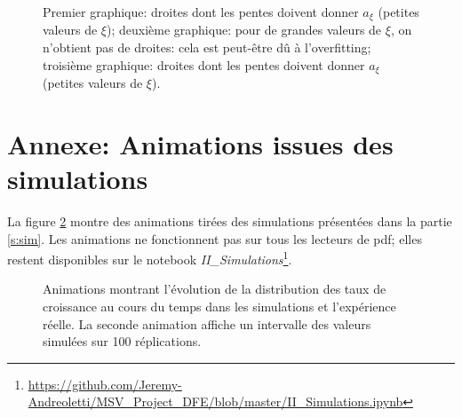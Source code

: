 \documentclass[12pt]{article}
\begin{document}
\begin{figure}[h]
\begin{center}
  \end{center}
  \caption{\label{fig:iv_verif}Premier graphique: droites dont les pentes doivent donner $a_{\xi}$ (petites valeurs de $\xi$); deuxième graphique: pour de grandes valeurs de $\xi$, on n'obtient pas de droites: cela est peut-être dû à l'overfitting; troisième graphique: droites dont les pentes doivent donner $a_{\xi}$ (petites valeurs de $\xi$).}
\end{figure}


\section{Annexe: Animations issues des simulations\label{ann:anim}}

La figure \ref{fig:animations} montre des animations tirées des simulations présentées dans la partie \ref{s:sim}. Les animations ne fonctionnent pas sur tous les lecteurs de pdf; elles restent disponibles sur le notebook \emph{II\_Simulations}\footnote{\url{https://github.com/Jeremy-Andreoletti/MSV_Project_DFE/blob/master/II_Simulations.ipynb}}.

\begin{figure}[h]
  \begin{center}
    \vspace{3mm}
  \end{center} 
  \caption{\label{fig:animations}Animations montrant l'évolution de la distribution des taux de croissance au cours du temps dans les simulations et l'expérience réelle. La seconde animation affiche un intervalle des valeurs simulées sur 100 réplications.}
\end{figure}
\end{document}
